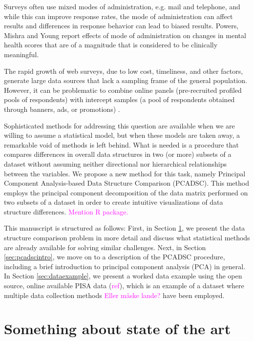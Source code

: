 \documentclass[titlepage,11pt,twoside]{article}
\newcommand{\hl}[1]{\textcolor{magenta}{#1}}
\begin{document}
Surveys often use mixed modes of administration, e.g. mail and telephone, and while this can improve response rates, the mode of administration can affect results \cite{Brambilla1987,McHorney1994} and differences in response behavior can lead to biased results. Powers, Mishra and Young \citeyearpar{Powers2005} report effects of mode of administration on changes in mental health scores that are of a magnitude that is considered to be clinically meaningful.

The rapid growth of web surveys, due to low cost, timeliness, and other factors, generate large data sources that lack a sampling frame of the general population. However, it can be problematic to combine online panels (pre-recruited profiled pools of respondents) with intercept samples (a pool of respondents obtained through banners, ads, or promotions) \cite{Liu2016}.

Sophisticated methods for addressing this question are available when we are willing to assume a statistical model, but when these models are taken away, a remarkable void of methods is left behind. What is needed is a procedure that compares differences in overall data structures in two (or more) subsets of a dataset without assuming neither directional nor hierarchical relationships between the variables. We propose a new method for this task, namely Principal Component Analysis-based Data Structure Comparison (PCADSC). This method employs the principal component decomposition of the data matrix performed on two subsets of a dataset in order to create intuitive visualizations of data structure differences. \hl{Mention R package.}


This manuscript is structured as follows: First, in Section \ref{sec:stateoftheart}, we present the data structure comparison problem in more detail and discuss what statistical methods are already available for solving similar challenges. Next, in Section \ref{sec:pcadscintro}, we move on to a description of the PCADSC procedure, including a brief introduction to principal component analysis (PCA) in general. In Section \ref{sec:dataexample}, we present a worked data example using the open source, online available PISA data (\hl{ref}), which is an example of a dataset where multiple data collection methods \hl{Eller måske lande?} have been employed.




\section{Something about state of the art}
\label{sec:stateoftheart}
\end{document}
